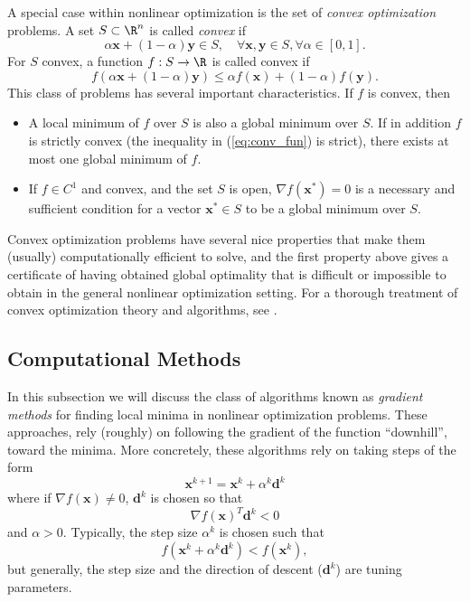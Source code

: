 A special case within nonlinear optimization is the set of \textit{convex optimization} problems. A set $S \subset \R^n$ is called \textit{convex} if 
\begin{equation}
    \alpha \bm{x} + (1 - \alpha) \bm{y} \in S, \quad \forall \bm{x},\bm{y} \in S, \forall \alpha \in [0,1].
\end{equation}
For $S$ convex, a function $f:S\to\R$ is called convex if 
\begin{equation}
    f(\alpha \bm{x} + (1-\alpha) \bm{y}) \leq \alpha f(\bm{x}) + (1-\alpha) f(\bm{y}).
    \label{eq:conv_fun}
\end{equation}
This class of problems has several important characteristics. If $f$ is convex, then
\begin{itemize}
    \item A local minimum of $f$ over $S$ is also a global minimum over $S$. If in addition $f$ is strictly convex (the inequality in (\ref{eq:conv_fun}) is strict), there exists at most one global minimum of $f$.
    \item If $f \in C^1$ and convex, and the set $S$ is open, $\nabla f(\bm{x}^*) = 0$ is a necessary and sufficient condition for a vector $\bm{x}^* \in S$ to be a global minimum over $S$.
\end{itemize}
Convex optimization problems have several nice properties that make them (usually) computationally efficient to solve, and the first property above gives a certificate of having obtained global optimality that is difficult or impossible to obtain in the general nonlinear optimization setting. For a thorough treatment of convex optimization theory and algorithms, see \cite{boyd2004convex}. 

\subsection{Computational Methods}


In this subsection we will discuss the class of algorithms known as \textit{gradient methods} for finding local minima in nonlinear optimization problems. These approaches, rely (roughly) on following the gradient of the function ``downhill'', toward the minima. More concretely, these algorithms rely on taking steps of the form
\begin{equation}
    \bm{x}^{k+1} = \bm{x}^k + \alpha^{k} \bm{d}^k
\end{equation}
where if $\nabla f(\bm{x}) \neq 0$, $\bm{d}^k$ is chosen so that 
\begin{equation}
    \nabla f(\bm{x})^T \bm{d}^k < 0
\end{equation}
and $\alpha > 0$. Typically, the step size $\alpha^k$ is chosen such that 
\begin{equation}
    f(\bm{x}^k + \alpha^k \bm{d}^k) < f(\bm{x}^k),
\end{equation}
but generally, the step size and the direction of descent ($\bm{d}^k$) are tuning parameters. 

